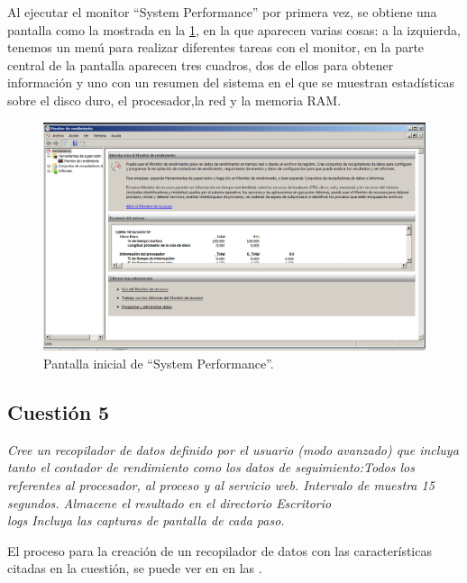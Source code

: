 Al ejecutar el monitor “System Performance” por primera vez, se obtiene una pantalla como la mostrada en la  \cref{fig4}, en la que aparecen varias cosas: a la izquierda, tenemos un menú para realizar diferentes tareas con el monitor, en la parte central de la pantalla aparecen tres cuadros, dos de ellos para obtener información y uno con un resumen del sistema en el que se muestran estadísticas sobre el disco duro, el procesador,la red y la memoria RAM.

\begin{figure}[H]
  \begin{center}
    \includegraphics[width=1\textwidth]{imagenes/perfmon}
    \caption{Pantalla inicial de “System Performance”.}
    \label{fig4}
  \end{center}
\end{figure}

\subsection{Cuestión 5}
\textit{Cree un recopilador de datos definido por el usuario (modo avanzado) que incluya tanto el contador de rendimiento como los datos de seguimiento:Todos los referentes al procesador, al proceso y al servicio web. Intervalo de muestra 15 segundos. Almacene el resultado en el directorio Escritorio\\logs Incluya las capturas de pantalla de cada paso.}
\newline

El proceso para la creación de un recopilador de datos con las características citadas en la cuestión, se puede ver en en las .


